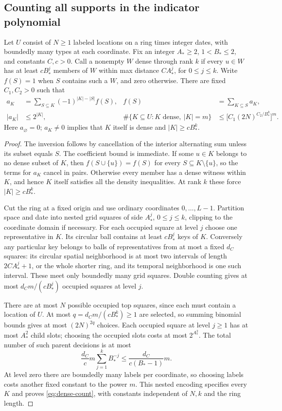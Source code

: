 \subsection{Counting all supports in the indicator polynomial}
\begin{lemma}\label{lem:dense-count}
Let $U$ consist of $N\ge1$ labeled locations on a ring times integer dates, with boundedly many types at each coordinate. Fix an integer $A_*\ge2$, $1<B_*\le2$, and constants $C,c>0$. Call a nonempty $W$ dense through rank $k$ if every $u\in W$ has at least $cB_*^j$ members of $W$ within max distance $CA_*^j$, for $0\le j\le k$. Write $f(S)=1$ when $S$ contains such a $W$, and zero otherwise. There are fixed $C_1,C_2>0$ such that
\begin{align}
 a_K&=\sum_{S\subseteq K}(-1)^{|K|-|S|}f(S),
 &f(S)&=\sum_{K\subseteq S}a_K,\label{eq:mobius}\\
 |a_K|&\le2^{|K|},
 &\#\{K\subseteq U:K\text{ dense},\ |K|=m\}
 &\le\bigl[C_1(2N)^{C_2/B_*^k}\bigr]^m.\label{eq:dense-count}
\end{align}
Here $a_\varnothing=0$; $a_K\ne0$ implies that $K$ itself is dense and $|K|\ge cB_*^k$.
\end{lemma}
\begin{proof}
The inversion follows by cancellation of the interior alternating sum unless its subset equals $S$. The coefficient bound is immediate. If some $u\in K$ belongs to no dense subset of $K$, then $f(S\cup\{u\})=f(S)$ for every $S\subseteq K\setminus\{u\}$, so the terms for $a_K$ cancel in pairs. Otherwise every member has a dense witness within $K$, and hence $K$ itself satisfies all the density inequalities. At rank $k$ these force $|K|\ge cB_*^k$.

Cut the ring at a fixed origin and use ordinary coordinates $0,\ldots,L-1$. Partition space and date into nested grid squares of side $A_*^j$, $0\le j\le k$, clipping to the coordinate domain if necessary. For each occupied square at level $j$ choose one representative in $K$. Its circular ball contains at least $cB_*^j$ keys of $K$. Conversely any particular key belongs to balls of representatives from at most a fixed $d_C$ squares: its circular spatial neighborhood is at most two intervals of length $2CA_*^j+1$, or the whole shorter ring, and its temporal neighborhood is one such interval. These meet only boundedly many grid squares. Double counting gives at most $d_Cm/(cB_*^j)$ occupied squares at level $j$.

There are at most $N$ possible occupied top squares, since each must contain a location of $U$. At most $q=d_Cm/(cB_*^k)\ge1$ are selected, so summing binomial bounds gives at most $(2N)^{2q}$ choices. Each occupied square at level $j\ge1$ has at most $A_*^2$ child slots; choosing the occupied slots costs at most $2^{A_*^2}$. The total number of such parent decisions is at most
\[
 \frac{d_C}{c}m\sum_{j=1}^k B_*^{-j}
 \le\frac{d_C}{c(B_*-1)}m.
\]
At level zero there are boundedly many labels per coordinate, so choosing labels costs another fixed constant to the power $m$. This nested encoding specifies every $K$ and proves \eqref{eq:dense-count}, with constants independent of $N,k$ and the ring length.
\end{proof}

